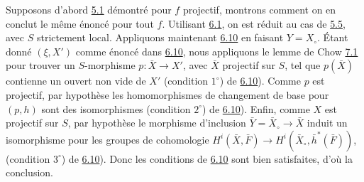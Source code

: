 \documentclass[10pt]{../fichiers-configuration-latex/smfart}
\begin{document}
Supposons d'abord \hyperref[XII.thm5.1]{5.1} démontré pour $f$ projectif, montrons comment on
en conclut le même énoncé pour tout $f$. Utilisant \hyperref[XII.lem6.1]{6.1}, on est réduit
au cas de \hyperref[XII.cor5.5]{5.5}, avec $S$ strictement local. Appliquons maintenant \hyperref[XII.cor6.10]{6.10}
en faisant $Y=X_{\circ}$. Étant donné $(\xi, X')$ comme énoncé dans
\hyperref[XII.cor6.10]{6.10}, nous appliquons le lemme de Chow \hyperref[XII.lem7.1]{7.1} pour trouver un
$S$-morphisme $p:\bar{X}\rightarrow X'$, avec $\bar{X}$ projectif sur
$S$, tel que $p(\bar{X})$ contienne un ouvert non vide de $X'$
(condition $1^{\circ}$) de \hyperref[XII.cor6.10]{6.10}). Comme $p$ est projectif, par
hypothèse les homomorphismes de changement de base pour $(p,h)$ sont
des isomorphismes (condition $2^{\circ}$) de \hyperref[XII.cor6.10]{6.10}). Enfin, comme $X$
est projectif sur $S$, par hypothèse le morphisme d'inclusion
$\bar{Y}=\bar{X}_{\circ}\rightarrow \bar{X}$ induit un isomorphisme
pour les groupes de cohomologie $H^{i}(\bar{X},\bar{F})\rightarrow
H^{i}(\bar{X}_{\circ},\bar{h}^{\ast}(\bar{F}))$, (condition
$3^{\circ}$) de \hyperref[XII.cor6.10]{6.10}). Donc les conditions de \hyperref[XII.cor6.10]{6.10} sont bien
satisfaites, d'où la conclusion.
\end{document}
